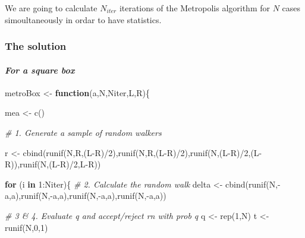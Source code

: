 \documentclass[11pt]{article}
\newenvironment{Shaded}{}{}
\newcommand{\DecValTok}[1]{\textcolor[rgb]{0.25,0.63,0.44}{{#1}}}
\newcommand{\CommentTok}[1]{\textcolor[rgb]{0.38,0.63,0.69}{\textit{{#1}}}}
\newcommand{\OtherTok}[1]{\textcolor[rgb]{0.00,0.44,0.13}{{#1}}}
\newcommand{\FunctionTok}[1]{\textcolor[rgb]{0.02,0.16,0.49}{{#1}}}
\newcommand{\NormalTok}[1]{{#1}}
\newcommand{\SpecialCharTok}[1]{\textcolor[rgb]{0.25,0.44,0.63}{{#1}}}
\newcommand{\ControlFlowTok}[1]{\textcolor[rgb]{0.00,0.44,0.13}{\textbf{{#1}}}}
\begin{document}
We are going to calculate \(N_{iter}\) iterations of the Metropolis
algorithm for \(N\) cases simoultaneously in ordar to have statistics.

\hypertarget{the-solution-1}{%
\subsubsection{\texorpdfstring{\textbf{The
solution}}{The solution}}\label{the-solution-1}}

\hypertarget{for-a-square-box}{%
\paragraph{\texorpdfstring{\emph{For a square
box}}{For a square box}}\label{for-a-square-box}}

\begin{Shaded}
\begin{Highlighting}[]
\NormalTok{metroBox }\OtherTok{\textless{}{-}} \ControlFlowTok{function}\NormalTok{(a,N,Niter,L,R)\{}
    
\NormalTok{    mea }\OtherTok{\textless{}{-}} \FunctionTok{c}\NormalTok{()}
    
    \CommentTok{\# 1. Generate a sample of random walkers}
    
\NormalTok{    r }\OtherTok{\textless{}{-}} \FunctionTok{cbind}\NormalTok{(}\FunctionTok{runif}\NormalTok{(N,R,(L}\SpecialCharTok{{-}}\NormalTok{R)}\SpecialCharTok{/}\DecValTok{2}\NormalTok{),}\FunctionTok{runif}\NormalTok{(N,R,(L}\SpecialCharTok{{-}}\NormalTok{R)}\SpecialCharTok{/}\DecValTok{2}\NormalTok{),}\FunctionTok{runif}\NormalTok{(N,(L}\SpecialCharTok{{-}}\NormalTok{R)}\SpecialCharTok{/}\DecValTok{2}\NormalTok{,(L}\SpecialCharTok{{-}}\NormalTok{R)),}\FunctionTok{runif}\NormalTok{(N,(L}\SpecialCharTok{{-}}\NormalTok{R)}\SpecialCharTok{/}\DecValTok{2}\NormalTok{,L}\SpecialCharTok{{-}}\NormalTok{R))}
    
    \ControlFlowTok{for}\NormalTok{ (i }\ControlFlowTok{in} \DecValTok{1}\SpecialCharTok{:}\NormalTok{Niter)\{}
        \CommentTok{\# 2. Calculate the random walk}
\NormalTok{        delta }\OtherTok{\textless{}{-}} \FunctionTok{cbind}\NormalTok{(}\FunctionTok{runif}\NormalTok{(N,}\SpecialCharTok{{-}}\NormalTok{a,a),}\FunctionTok{runif}\NormalTok{(N,}\SpecialCharTok{{-}}\NormalTok{a,a),}\FunctionTok{runif}\NormalTok{(N,}\SpecialCharTok{{-}}\NormalTok{a,a),}\FunctionTok{runif}\NormalTok{(N,}\SpecialCharTok{{-}}\NormalTok{a,a))}
        
        \CommentTok{\# 3 \& 4. Evaluate q and accept/reject rn with prob q}
\NormalTok{        q }\OtherTok{\textless{}{-}} \FunctionTok{rep}\NormalTok{(}\DecValTok{1}\NormalTok{,N)}
\NormalTok{        t }\OtherTok{\textless{}{-}} \FunctionTok{runif}\NormalTok{(N,}\DecValTok{0}\NormalTok{,}\DecValTok{1}\NormalTok{)}
        

\end{Highlighting}
\end{Shaded}
\end{document}
